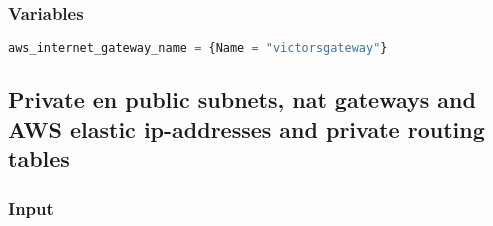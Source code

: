 \subsubsection{
{Variables}}
\label{sec:Variables}

\begin{lstlisting}[language=terraform]
    aws_internet_gateway_name = {Name = "victorsgateway"}     
\end{lstlisting}

\subsection{
{Private en public subnets, nat gateways and AWS elastic ip-addresses and private routing tables}}
\label{sec:Private en publieke subnets, nat gateways and AWS elastic ip-adressen en private route tabellen}

\subsubsection{
{Input}}
\label{sec:Input}

